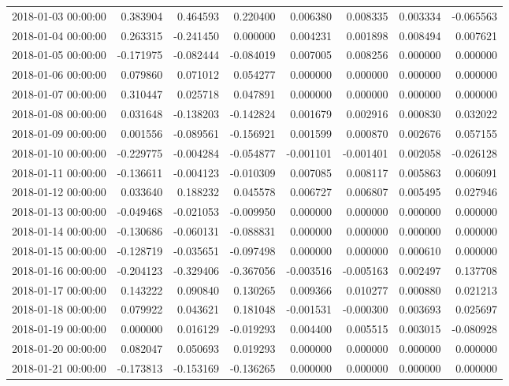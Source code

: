 \begin{tabular}{lrrrrrrr}
2018-01-03 00:00:00 & 0.383904 & 0.464593 & 0.220400 & 0.006380 & 0.008335 & 0.003334 & -0.065563 \\
2018-01-04 00:00:00 & 0.263315 & -0.241450 & 0.000000 & 0.004231 & 0.001898 & 0.008494 & 0.007621 \\
2018-01-05 00:00:00 & -0.171975 & -0.082444 & -0.084019 & 0.007005 & 0.008256 & 0.000000 & 0.000000 \\
2018-01-06 00:00:00 & 0.079860 & 0.071012 & 0.054277 & 0.000000 & 0.000000 & 0.000000 & 0.000000 \\
2018-01-07 00:00:00 & 0.310447 & 0.025718 & 0.047891 & 0.000000 & 0.000000 & 0.000000 & 0.000000 \\
2018-01-08 00:00:00 & 0.031648 & -0.138203 & -0.142824 & 0.001679 & 0.002916 & 0.000830 & 0.032022 \\
2018-01-09 00:00:00 & 0.001556 & -0.089561 & -0.156921 & 0.001599 & 0.000870 & 0.002676 & 0.057155 \\
2018-01-10 00:00:00 & -0.229775 & -0.004284 & -0.054877 & -0.001101 & -0.001401 & 0.002058 & -0.026128 \\
2018-01-11 00:00:00 & -0.136611 & -0.004123 & -0.010309 & 0.007085 & 0.008117 & 0.005863 & 0.006091 \\
2018-01-12 00:00:00 & 0.033640 & 0.188232 & 0.045578 & 0.006727 & 0.006807 & 0.005495 & 0.027946 \\
2018-01-13 00:00:00 & -0.049468 & -0.021053 & -0.009950 & 0.000000 & 0.000000 & 0.000000 & 0.000000 \\
2018-01-14 00:00:00 & -0.130686 & -0.060131 & -0.088831 & 0.000000 & 0.000000 & 0.000000 & 0.000000 \\
2018-01-15 00:00:00 & -0.128719 & -0.035651 & -0.097498 & 0.000000 & 0.000000 & 0.000610 & 0.000000 \\
2018-01-16 00:00:00 & -0.204123 & -0.329406 & -0.367056 & -0.003516 & -0.005163 & 0.002497 & 0.137708 \\
2018-01-17 00:00:00 & 0.143222 & 0.090840 & 0.130265 & 0.009366 & 0.010277 & 0.000880 & 0.021213 \\
2018-01-18 00:00:00 & 0.079922 & 0.043621 & 0.181048 & -0.001531 & -0.000300 & 0.003693 & 0.025697 \\
2018-01-19 00:00:00 & 0.000000 & 0.016129 & -0.019293 & 0.004400 & 0.005515 & 0.003015 & -0.080928 \\
2018-01-20 00:00:00 & 0.082047 & 0.050693 & 0.019293 & 0.000000 & 0.000000 & 0.000000 & 0.000000 \\
2018-01-21 00:00:00 & -0.173813 & -0.153169 & -0.136265 & 0.000000 & 0.000000 & 0.000000 & 0.000000 \\

\end{tabular}

